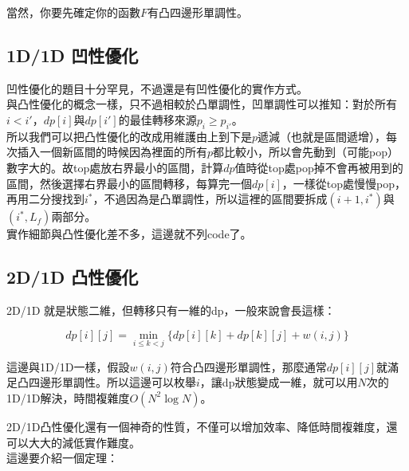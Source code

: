 \documentclass[main.tex]{subfiles}
\begin{document}
	當然，你要先確定你的函數$F$有凸四邊形單調性。
	
	\subsection{1D/1D 凹性優化}
	
	凹性優化的題目十分罕見，不過還是有凹性優化的實作方式。\\
	
	與凸性優化的概念一樣，只不過相較於凸單調性，凹單調性可以推知：對於所有$i < i'$，$dp[i]$與$dp[i']$的最佳轉移來源$p_i \geq p_{i'}$。\\
	
	所以我們可以把凸性優化的改成用維護由上到下是$p$遞減（也就是區間遞增），每次插入一個新區間的時候因為裡面的所有$p$都比較小，所以會先動到（可能pop）數字大的。故top處放右界最小的區間，計算$dp$值時從top處pop掉不會再被用到的區間，然後選擇右界最小的區間轉移，每算完一個$dp[i]$，一樣從top處慢慢pop，再用二分搜找到$i^*$，不過因為是凸單調性，所以這裡的區間要拆成$(i+1, i^*)$與$(i^*, L_f)$兩部分。\\
	
	實作細節與凸性優化差不多，這邊就不列code了。
	
	\subsection{2D/1D 凸性優化}
	
	2D/1D 就是狀態二維，但轉移只有一維的dp，一般來說會長這樣：
	
	\begin{displaymath}
	dp[i][j] = \min\limits_{i\leq k < j} \{ dp[i][k] + dp[k][j] + w(i, j) \}
	\end{displaymath}
	
	這邊與1D/1D一樣，假設$w(i, j)$符合凸四邊形單調性，那麼通常$dp[i][j]$就滿足凸四邊形單調性。所以這邊可以枚舉$i$，讓dp狀態變成一維，就可以用$N$次的1D/1D解決，時間複雜度$O(N^2\log N)$。\\
	
	
	2D/1D凸性優化還有一個神奇的性質，不僅可以增加效率、降低時間複雜度，還可以大大的減低實作難度。\\
	
	這邊要介紹一個定理：\\
	
	
\end{document}
